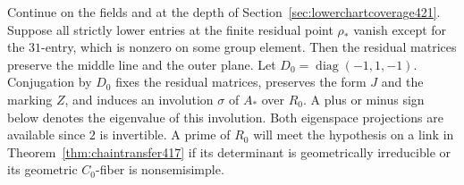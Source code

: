 \documentclass[a4paper,11pt]{article}
\theoremstyle{definition}
\theoremstyle{remark}
\numberwithin{equation}{section}
\begin{document}
Continue on the fields and at the depth of
Section~\ref{sec:lowerchartcoverage421}. Suppose all strictly
lower entries at the finite residual point \(\rho_*\) vanish
except for the \(31\)-entry, which is nonzero on some group
element. Then the residual matrices preserve the middle line
and the outer plane. Let
\(D_0=\operatorname{diag}(-1,1,-1)\). Conjugation by \(D_0\)
fixes the residual matrices, preserves the form \(J\) and
the marking \(Z\), and induces an involution \(\sigma\) of
\(A_*\) over \(R_0\). A plus or minus sign below denotes the
eigenvalue of this involution. Both eigenspace projections
are available since \(2\) is invertible. A prime of \(R_0\)
will meet the hypothesis on a link in
Theorem~\ref{thm:chaintransfer417} if its determinant is
geometrically irreducible or its geometric \(C_0\)-fiber
is nonsemisimple.
\end{document}
